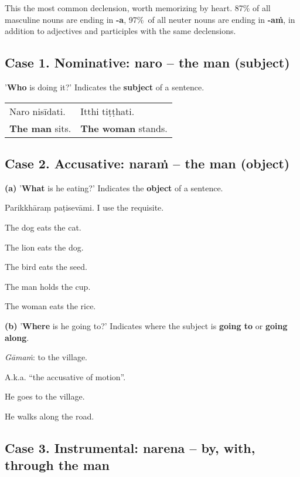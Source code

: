 \documentclass[11pt,oneside]{memoir}
\begin{document}
This the most common declension, worth memorizing by heart. 87\% of all masculine
nouns are ending in \textbf{-a}, \mbox{97\% of} all neuter nouns are ending in \textbf{-aṁ}, in
addition to adjectives and participles with the same declensions.

\clearpage

\subsection{Case 1. Nominative: naro -- the man (subject)}
\label{sec:org499e5cf}

'\textbf{Who} is doing it?' Indicates the \textbf{subject} of a sentence.

\begin{center}
\begin{tabular}{ll}
Naro nisīdati. & Itthi tiṭṭhati.\\[0pt]
\textbf{The man} sits. & \textbf{The woman} stands.\\[0pt]
\end{tabular}
\end{center}

\subsection{Case 2. Accusative: naraṁ -- the man (object)}
\label{sec:org6e72a90}

\textbf{(a)} '\textbf{What} is he eating?' Indicates the \textbf{object} of a sentence.

Parikkhāraṃ paṭisevāmi.
I use the requisite.

The dog eats the cat.

The lion eats the dog.

The bird eats the seed.

The man holds the cup.

The woman eats the rice.

\textbf{(b)} '\textbf{Where} is he going to?' Indicates where the subject is \textbf{going to} or \textbf{going along}.

\emph{Gāmaṁ}: to the village.

A.k.a. ``the accusative of motion''.

He goes to the village.

He walks along the road.

\subsection{Case 3. Instrumental: narena -- by, with, through the man}
\label{sec:org4b09087}
\end{document}
